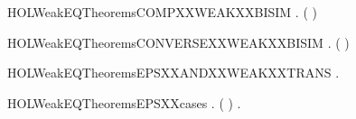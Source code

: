 \newcommand{\HOLWeakEQDefinitionsWEAKXXTRANS}{\UseVerbatim{HOLWeakEQDefinitionsWEAKXXTRANS}}
\newcommand{\HOLWeakEQDefinitions}{
\HOLDfnTag{WeakEQ}{EPS_def}\HOLWeakEQDefinitionsEPSXXdef
\HOLDfnTag{WeakEQ}{STABLE}\HOLWeakEQDefinitionsSTABLE
\HOLDfnTag{WeakEQ}{WEAK_BISIM_def}\HOLWeakEQDefinitionsWEAKXXBISIMXXdef
\HOLDfnTag{WeakEQ}{WEAK_EQUIV_def}\HOLWeakEQDefinitionsWEAKXXEQUIVXXdef
\HOLDfnTag{WeakEQ}{WEAK_SIM_def}\HOLWeakEQDefinitionsWEAKXXSIMXXdef
\HOLDfnTag{WeakEQ}{WEAK_TRANS}\HOLWeakEQDefinitionsWEAKXXTRANS
}
\begin{SaveVerbatim}{HOLWeakEQTheoremsCOMPXXWEAKXXBISIM}
\HOLTokenTurnstile{} \HOLSymConst{\HOLTokenForall{}} .
         \HOLSymConst{\HOLTokenConj{}}   \HOLSymConst{\HOLTokenImp{}}
        (  )
\end{SaveVerbatim}
\newcommand{\HOLWeakEQTheoremsCOMPXXWEAKXXBISIM}{\UseVerbatim{HOLWeakEQTheoremsCOMPXXWEAKXXBISIM}}
\begin{SaveVerbatim}{HOLWeakEQTheoremsCONVERSEXXWEAKXXBISIM}
\HOLTokenTurnstile{} \HOLSymConst{\HOLTokenForall{}}.   \HOLSymConst{\HOLTokenImp{}}  ( )
\end{SaveVerbatim}
\newcommand{\HOLWeakEQTheoremsCONVERSEXXWEAKXXBISIM}{\UseVerbatim{HOLWeakEQTheoremsCONVERSEXXWEAKXXBISIM}}
\begin{SaveVerbatim}{HOLWeakEQTheoremsEPSXXANDXXWEAKXXTRANS}
\HOLTokenTurnstile{} \HOLSymConst{\HOLTokenForall{}}   .    \HOLSymConst{\HOLTokenConj{}}  \HOLTokenWeakTransBegin{}\HOLTokenWeakTransEnd {} \HOLSymConst{\HOLTokenImp{}}  \HOLTokenWeakTransBegin{}\HOLTokenWeakTransEnd {}
\end{SaveVerbatim}
\newcommand{\HOLWeakEQTheoremsEPSXXANDXXWEAKXXTRANS}{\UseVerbatim{HOLWeakEQTheoremsEPSXXANDXXWEAKXXTRANS}}
\begin{SaveVerbatim}{HOLWeakEQTheoremsEPSXXcases}
\HOLTokenTurnstile{} \HOLSymConst{\HOLTokenForall{}} .
          \HOLSymConst{\HOLTokenEquiv{}}
        \HOLTokenTransBegin\HOLConst{\ensuremath{\tau}}\HOLTokenTransEnd {} \HOLSymConst{\HOLTokenDisj{}} ( \HOLSymConst{=} ) \HOLSymConst{\HOLTokenDisj{}} \HOLSymConst{\HOLTokenExists{}}.    \HOLSymConst{\HOLTokenConj{}}   
\end{SaveVerbatim}
